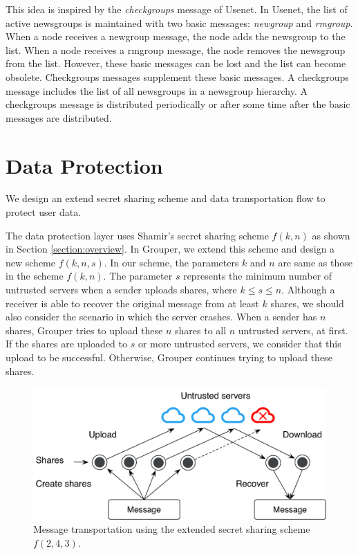 \documentclass[a4paper,11pt]{report}
\begin{document}
This idea is inspired by the \emph{checkgroups} message of Usenet\cite{usenet}.
In Usenet, the list of active newsgroups is maintained with two basic messages: \emph{newgroup} and \emph{rmgroup}.
When a node receives a newgroup message, the node adds the newsgroup to the list.
When a node receives a rmgroup message, the node removes the newsgroup from the list.
However, these basic messages can be lost and the list can become obsolete.
Checkgroups messages supplement these basic messages.
A checkgroups message includes the list of all newsgroups in a newsgroup hierarchy.
A checkgroups message is distributed periodically or after some time after the basic messages are distributed.

\section{Data Protection}  \label{section:data_protection}

We design an extend secret sharing scheme and data transportation flow to protect user data.

The data protection layer uses Shamir's secret sharing scheme $f(k, n)$ as shown in Section \ref{section:overview}.
In Grouper, we extend this scheme and design a new scheme $ f(k, n, s)$.
In our scheme, the parameters $k$ and $n$ are same as those in the scheme $f(k, n)$. 
The parameter $s$ represents the minimum number of untrusted servers when a sender uploads shares, where $k \leq s \leq n$.
Although a receiver is able to recover the original message from at least $k$ shares, we should also consider the scenario in which the server crashes. 
When a sender has $n$ shares, Grouper tries to upload these $n$ shares to all $n$ untrusted servers, at first. 
If the shares are uploaded to $s$ or more untrusted servers, we consider that this upload to be successful.
Otherwise, Grouper continues trying to upload these shares.

\begin{figure}[t]
	\centering
	\includegraphics[scale=0.65]{transportation}
	\caption{Message transportation using the extended secret sharing scheme $f(2, 4, 3)$.}
	\label{fig:transportation}
\end{figure}
\end{document}
